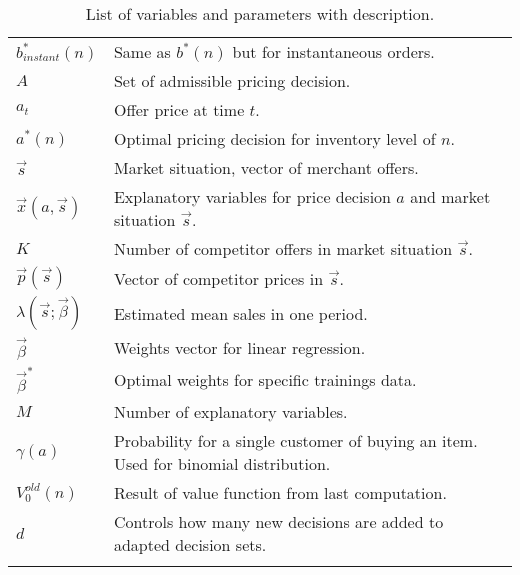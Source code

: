 \begin{longtable}{ll}
		$b^*_{instant}(n)$ & Same as $b^*(n)$ but for instantaneous orders. \\
		$A$ & Set of admissible pricing decision. \\
		$a_t$ & Offer price at time $t$. \\
		$a^*(n)$ & Optimal pricing decision for inventory level of $n$. \\
		$\vec{s}$ & Market situation, vector of merchant offers. \\
		$\vec{x}(a, \vec{s})$ & \makecell[l]{Explanatory variables for price decision $a$ \\ and market situation $\vec{s}$.} \\
		$K$ & Number of competitor offers in market situation $\vec{s}$. \\
		$\vec{p}(\vec{s})$ & Vector of competitor prices in $\vec{s}$. \\
		$\lambda(\vec{s}; \vec{\beta})$ & Estimated mean sales in one period. \\
		$\vec{\beta}$ & Weights vector for linear regression. \\
		$\vec{\beta}^*$ & Optimal weights for specific trainings data. \\
		$M$ & Number of explanatory variables. \\
		$\gamma(a)$ & \makecell[l]{Probability for a single customer of buying an item. \\ Used for binomial distribution.} \\
		$V_0^{old}(n)$ & Result of value function from last computation. \\
		$d$ & Controls how many new decisions are added to adapted decision sets. \\
		\bottomrule
	\caption[List of Variables and Parameters]{List of variables and parameters with description.}
	\label{tab:notations}
\end{longtable}
